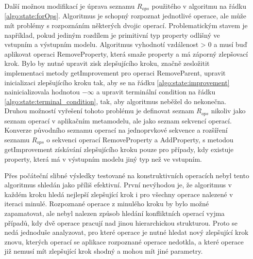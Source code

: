 \documentclass[11pt,twoside,a4paper]{book}
\begin{document}
Další možnou modifikací je úprava seznamu $R_{ops}$ použitého v algoritmu na
řádku \ref{algo:state:forOps}.
Algoritmus je schopný rozpoznat jednotlivé operace, ale může mít problémy s rozpoznáním
některých dvojic operací. Problematickým stavem je například, pokud jediným
rozdílem je primitivní typ property odlišný ve vstupním a výstupním modelu.
Algoritmus vyhodnotí vzdálenost > 0 a musí buď aplikovat operaci RemoveProperty,
která smaže property a má záporný zlepšovací krok. Bylo by nutné upravit
zisk zlepšujícího kroku, značně zesložitit implementaci metody getImprovement
pro operaci RemoveParent, upravit inicializaci zlepšujícího kroku tak, aby se
na řádku \ref{algo:state:improvement}
nainicializovala hodnotou $-\infty$ a
upravit terminální condition na řádku \ref{algo:state:terminal_condition}, tak,
aby algoritmus neběžel do nekonečna. Druhou možností vyřešení tohoto problému je
definovat seznam $R_{ops}$ nikoliv jako seznam operací v aplikačním
metamodelu, ale jako seznam sekvencí operací. Konverze původního seznamu operací
na jednoprvkové sekvence a rozšíření seznamu $R_{ops}$ o sekvenci operací
RemoveProperty a AddProperty, s metodou getImprovement získávání zlepšujícího
kroku pouze pro případy, kdy existuje property, která má v výstupním modelu
jiný typ než ve vstupním.

     
Přes počáteční slibné výsledky testované na konstruktivních operacích nebyl
tento algoritmus shledán jako příliš efektivní. První nevýhodou je, že
algoritmus v každém kroku hledá nejlepší zlepšující krok i pro všechny operace nalezené v
iteraci minulé. Rozpoznané operace z minulého kroku by bylo možné zapamatovat,
ale nebyl nalezen způsob hledání konfliktních operací vyjma případů, kdy dvě
operace pracují nad jinou hierarchickou strukturou. Proto se nedá jednoduše
analyzovat, pro které operace je nutné hledat nový zlepšující krok znovu,
kterých operací se aplikace rozpoznané operace nedotkla, a které operace již
nemusí mít zlepšující krok shodný a mohou mít jiné parametry.
\end{document}
